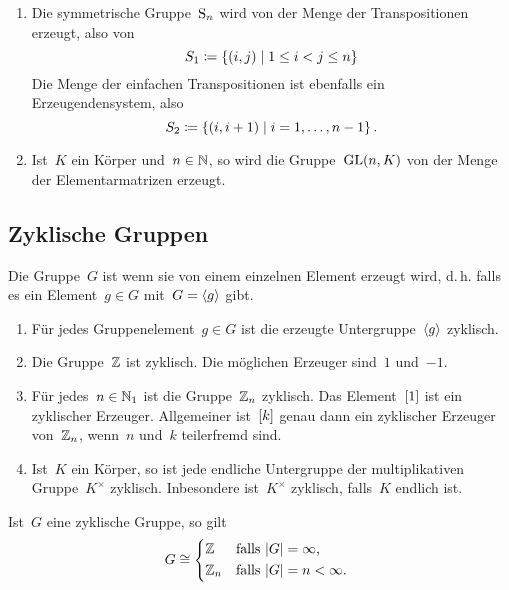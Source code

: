 \begin{example}
  \leavevmode
  \begin{enumerate}
    \item
      Die symmetrische Gruppe~$\operatorname{S}_n$ wird von der Menge der Transpositionen erzeugt, also von
      \[
        S_1
        \defined
        \{
          (i, j)
        \suchthat
          1 \leq i < j \leq n
        \}
      \]
      Die Menge der einfachen Transpositionen ist ebenfalls ein Erzeugendensystem, also
      \[
        S_2
        \defined
        \{
          (i, i+1)
        \suchthat
          i = 1, \dotsc, n-1
        \} \,.
      \]
    \item
      Ist~$K$ ein Körper und~$n \in \mathbb{N}$, so wird die Gruppe~$\operatorname{GL}(n,K)$ von der Menge der Elementarmatrizen erzeugt.
  \end{enumerate}
\end{example}


\subsection{Zyklische Gruppen}

\begin{definition}
  Die Gruppe~$G$ ist  wenn sie von einem einzelnen Element erzeugt wird, d.\,h. falls es ein Element~$g \in G$ mit~$G = \langle g\rangle$ gibt.
\end{definition}

\begin{example}
  \leavevmode
  \begin{enumerate}
    \item
      Für jedes Gruppenelement~$g \in G$ ist die erzeugte Untergruppe~$\langle g\rangle$ zyklisch.
    \item
      Die Gruppe~$\mathbb{Z}$ ist zyklisch.
      Die möglichen Erzeuger sind~$1$ und~$-1$.
    \item
      Für jedes~$n \in \mathbb{N}_1$ ist die Gruppe~$\mathbb{Z}_n$ zyklisch.
      Das Element~$[1]$ ist ein zyklischer Erzeuger.
      Allgemeiner ist~$[k]$ genau dann ein zyklischer Erzeuger von~$\mathbb{Z}_n$, wenn~$n$ und~$k$ teilerfremd sind.
    \item
      Ist~$K$ ein Körper, so ist jede endliche Untergruppe der multiplikativen Gruppe~$K^\times$ zyklisch.
      Inbesondere ist~$K^\times$ zyklisch, falls~$K$ endlich ist.
  \end{enumerate}
\end{example}

\begin{theorem}
  Ist~$G$ eine zyklische Gruppe, so gilt
  \[
    G
    \cong
    \begin{cases*}
        \Integer
        &
        falls~$\card{G} = \infty$,
        \\
        \Integer_n
        &
        falls~$\card{G} = n < \infty$.
    \end{cases*}
  \]
\end{theorem}

